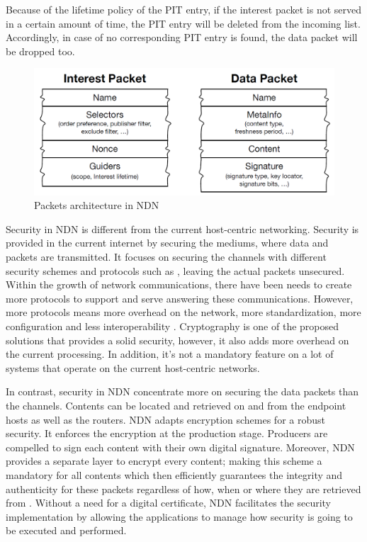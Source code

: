 \documentclass[conference]{IEEEtran}
\begin{document}
Because of the lifetime policy of the PIT entry, if the interest packet is not served in a certain amount of time, the PIT entry will be deleted from the incoming list. Accordingly, in case of no corresponding PIT entry is found, the data packet will be dropped too.

\begin{figure} [ht]
    \centering
    \includegraphics[width=\columnwidth]{NDN_Packets.png}
    \caption{\small Packets architecture in NDN}
    \label{fig:my_label1}
\end{figure}
  
Security in NDN is different from the current host-centric networking. Security is provided in the current internet by securing the mediums, where data and packets are transmitted. It focuses on securing the channels with different security schemes and protocols such as \cite{NGUYEN201517}\cite{661700}\cite{Fumy1998}\cite{Prentice-Hall:2000:ISP:518066}, leaving the actual packets unsecured. Within the growth of network communications, there have been needs to create more protocols to support and serve answering these communications. However, more protocols means more overhead on the network, more standardization, more configuration and less interoperability \cite{cholez:hal-00785298}. Cryptography is one of the proposed solutions that provides a solid security, however, it also adds more overhead on the current processing. In addition, it's not a mandatory feature on a lot of systems that operate on the current host-centric networks.

In contrast, security in NDN concentrate more on securing the data packets than the channels. Contents can be located and retrieved on and from the endpoint hosts as well as the routers. NDN adapts encryption schemes for a robust security. It enforces the encryption at the production stage. Producers are compelled to sign each content with their own digital signature. Moreover, NDN provides a separate layer to encrypt every content; making this scheme a mandatory for all contents which then efficiently guarantees the integrity and authenticity for these packets regardless of how, when or where they are retrieved from \cite{Gasti2013}. Without a need for a digital certificate, NDN facilitates the security implementation by allowing the applications to manage how security is going to be executed and performed.     
\end{document}
